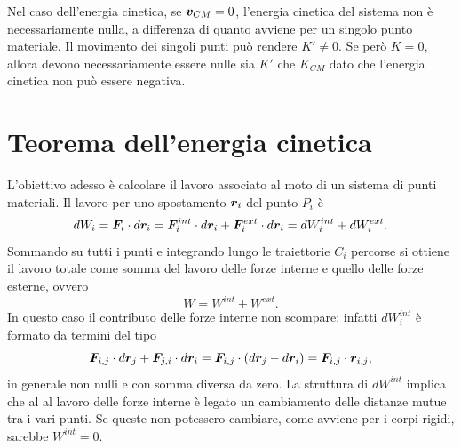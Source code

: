 Nel caso dell'energia cinetica, se $\bm{v}_{CM}=0$, l'energia cinetica del sistema non è necessariamente nulla, a differenza di quanto avviene per un singolo punto materiale.  Il movimento dei singoli punti può rendere $K'\neq0$. Se però $K=0$, allora devono necessariamente essere nulle sia $K'$ che $K_{CM}$ dato che l'energia cinetica non può essere negativa. 

\section{Teorema dell'energia cinetica}
L'obiettivo adesso è calcolare il lavoro associato al moto di un sistema di punti materiali. Il lavoro per uno spostamento $\bm{r}_i$ del punto $P_i$ è
\begin{equation}
    dW_i=\bm{F}_i\cdot d\bm{r}_i=\bm{F}_i^{int}\cdot d\bm{r}_i+\bm{F}_i^{ext}\cdot d\bm{r}_i=dW_i^{int}+dW_i^{ext}.
\end{equation}
Sommando su tutti i punti e integrando lungo le traiettorie $C_i$ percorse si ottiene il lavoro totale come somma del lavoro delle forze interne e quello delle forze esterne, ovvero
\begin{equation}
    W=W^{int}+W^{ext}.
\end{equation}
In questo caso il contributo delle forze interne non scompare: infatti $dW_i^{int}$ è formato da termini del tipo
\begin{equation}
    \bm{F}_{i,j}\cdot d\bm{r}_j+\bm{F}_{j,i}\cdot d\bm{r}_i=\bm{F}_{i,j}\cdot(d\bm{r}_j-d\bm{r}_i)=\bm{F}_{i,j}\cdot\bm{r}_{i,j},
\end{equation}
in generale non nulli e con somma diversa da zero. La struttura di $dW^{int}$ implica che al al lavoro delle forze interne è legato un cambiamento delle distanze mutue tra i vari punti. Se queste non potessero cambiare, come avviene per i corpi rigidi, sarebbe $W^{int}=0$. 

